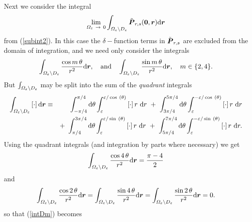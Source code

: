 Next we consider the integral
\begin{equation} \label{intDm}
\lim\limits_{{\mit \Omega }_{ \varepsilon }\ \rightarrow  \ 
0}\int_{{\mit \Omega }_{ \varepsilon }\backslash{\mit D}_{ \varepsilon }}{\tilde{\bmi  P}_{r,s}}({\bf 
0},{\bmi  r}){\rm d}{\bmi r}
\end{equation}
from (\ref{subint2}). In this case the $\delta-$function terms in 
${\tilde{\mbox{\boldmath$\mit P$\unboldmath}}_{r,s}}$ are 
excluded from the domain of integration, and we need only consider the 
integrals
\[
\int_{{\mit \Omega}_{\varepsilon}\backslash{\mit D}_{ \varepsilon }}{{\cos m\,\theta }\over {{r^2}}} {\rm 
d}{\mbox{\boldmath$\mit r$\unboldmath}}, \quad \mbox{and}
\quad \int_{{\mit \Omega}_{\varepsilon}\backslash{\mit D}_{ \varepsilon }}{{\sin m\,\theta }\over {{r^2}}} {\rm 
d}{\mbox{\boldmath$\mit r$\unboldmath}}, \quad m\in\{2,4\}.
\]
But $\int_{{\mit \Omega}_{\varepsilon}\backslash{\mit D}_{ \varepsilon }}$
 may be split into the sum of the {\em quadrant\/} integrals
\begin{eqnarray} \label{quadint}
\int_{{\mit \Omega}_{\varepsilon}\backslash{\mit D}_{ \varepsilon }}\left[ \cdot 
\right] {\rm d}{\mbox{\boldmath$\mit r$\unboldmath}}&\equiv&
\int_{- \pi   /4}^{ \pi   /4}{\rm d} \theta 
\int_{\varepsilon }^{\varepsilon   /\cos\ \left({ \theta 
}\right)}\left[ \cdot 
\right] r\ {\rm d}r\ + \
\int_{3 \pi   /4}^{5 \pi   
/4}{\rm d} \theta \int_{\varepsilon }^{  - \varepsilon   
/\cos\ \left({ \theta }\right)}\left[ \cdot 
\right] r\ {\rm d}r \nonumber\\
&&  +\ \int_{ \pi   
/4}^{3 \pi   /4}{\rm d} \theta \int_{\varepsilon }^{\varepsilon  
 /\sin\ \left({ \theta }\right)}\left[ \cdot 
\right] r\ {\rm d}r\ +\ \int_{5 \pi 
  /4}^{7 \pi   /4}{\rm d} \theta \int_{\varepsilon }^{ 
 - \varepsilon   /\sin\ \left({ \theta }\right)}\left[ \cdot 
\right] 
r\ {\rm d}r.
\end{eqnarray} 
Using the quadrant integrals (and integration by parts where 
necessary) we get
\[
\int_{{\mit \Omega}_{\varepsilon}\backslash{\mit D}_{ \varepsilon }}{{\cos 4\,\theta }\over {{r^2}}}  
{\rm d}{\mbox{\boldmath$\mit r$\unboldmath}}= {{\pi - 4} \over 2}
\]
and
\[
\int_{{\mit \Omega}_{\varepsilon}\backslash{\mit D}_{ \varepsilon }}{{\cos 2\,\theta }\over {{r^2}}}  {\rm d}{\mbox{\boldmath$\mit r$\unboldmath}}= 
\int_{{\mit \Omega}_{\varepsilon}\backslash{\mit D}_{ \varepsilon }}{{\sin 
4\,\theta }\over {{r^2}}}  {\rm d}{\mbox{\boldmath$\mit r$\unboldmath}}=
\int_{{\mit \Omega}_{\varepsilon}\backslash{\mit D}_{ \varepsilon }}{{\sin 
2\,\theta }\over {{r^2}}}  {\rm d}{\mbox{\boldmath$\mit r$\unboldmath}}=0.
\]
so that (\ref{intDm}) becomes

